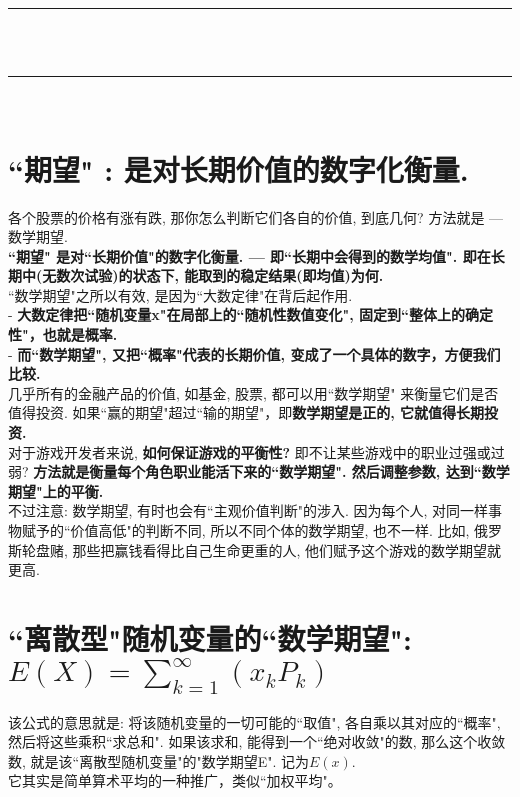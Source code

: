 \documentclass[UTF8]{ctexart}
\begin{document}
	~\\
	\hrule
	~\\
	
	
	~\\
	\hrule
	~\\
	
	\section{``期望" : 是对长期价值的数字化衡量.}
	
	各个股票的价格有涨有跌, 那你怎么判断它们各自的价值, 到底几何? 方法就是 --- 数学期望.  \\
	\textbf{``期望" 是对``长期价值"的数字化衡量. --- 即``长期中会得到的数学均值". 即在长期中(无数次试验)的状态下, 能取到的稳定结果(即均值)为何.} \\
	
	
	``数学期望"之所以有效, 是因为``大数定律"在背后起作用. \\
	- \textbf{大数定律把``随机变量x"在局部上的``随机性数值变化", 固定到``整体上的确定性"，也就是概率.} \\
	- \textbf{而``数学期望", 又把``概率"代表的长期价值, 变成了一个具体的数字，方便我们比较.} \\
	
	几乎所有的金融产品的价值, 如基金, 股票, 都可以用``数学期望" 来衡量它们是否值得投资. 如果``赢的期望"超过``输的期望"，即\textbf{数学期望是正的, 它就值得长期投资.} \\	
	对于游戏开发者来说, \textbf{如何保证游戏的平衡性?} 即不让某些游戏中的职业过强或过弱? \textbf{方法就是衡量每个角色职业能活下来的``数学期望". 然后调整参数, 达到``数学期望"上的平衡.} \\
	
	
	不过注意: 数学期望, 有时也会有``主观价值判断"的涉入. 因为每个人, 对同一样事物赋予的``价值高低"的判断不同, 所以不同个体的数学期望, 也不一样. 比如, 俄罗斯轮盘赌, 那些把赢钱看得比自己生命更重的人, 他们赋予这个游戏的数学期望就更高. 
	
	
	
	
	
	\section{``离散型"随机变量的``数学期望": $E(X)= \sum_{k=1}^{\infty} (x_k P_k)$}
	
	该公式的意思就是: 将该随机变量的一切可能的``取值", 各自乘以其对应的``概率", 然后将这些乘积``求总和". 如果该求和, 能得到一个``绝对收敛"的数, 那么这个收敛数, 就是该``离散型随机变量"的"数学期望E". 记为$E(x)$. \\
	它其实是简单算术平均的一种推广，类似``加权平均"。\\
	
\end{document}

